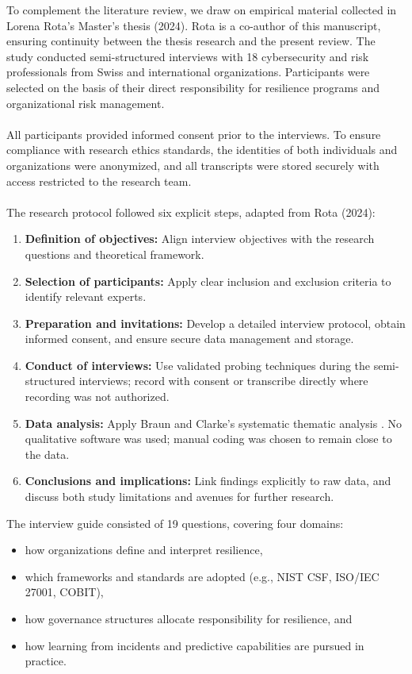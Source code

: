 To complement the literature review, we draw on empirical material collected in Lorena Rota’s Master’s thesis (2024). Rota is a co-author of this manuscript, ensuring continuity between the thesis research and the present review. The study conducted semi-structured interviews with 18 cybersecurity and risk professionals from Swiss and international organizations. Participants were selected on the basis of their direct responsibility for resilience programs and organizational risk management.\\
\\
All participants provided informed consent prior to the interviews. To ensure compliance with research ethics standards, the identities of both individuals and organizations were anonymized, and all transcripts were stored securely with access restricted to the research team.\\
\\
The research protocol followed six explicit steps, adapted from Rota (2024):
\begin{enumerate}
    \item \textbf{Definition of objectives:} Align interview objectives with the research questions and theoretical framework.
    \item \textbf{Selection of participants:} Apply clear inclusion and exclusion criteria to identify relevant experts.
    \item \textbf{Preparation and invitations:} Develop a detailed interview protocol, obtain informed consent, and ensure secure data management and storage.
    \item \textbf{Conduct of interviews:} Use validated probing techniques during the semi-structured interviews;
    record with consent or transcribe directly where recording was not authorized.  
    \item \textbf{Data analysis:} Apply Braun and Clarke’s systematic thematic analysis \autocite{braun2019thematic}.
    No qualitative software was used; manual coding was chosen to remain close to the data.  
    \item \textbf{Conclusions and implications:} Link findings explicitly to raw data, and discuss both study limitations and avenues for further research.\\
\end{enumerate}

The interview guide consisted of 19 questions, covering four domains:

\begin{itemize}
    \item[(a)] how organizations define and interpret resilience,
    \item[(b)] which frameworks and standards are adopted (e.g., NIST CSF, ISO/IEC 27001, COBIT),
    \item[(c)] how governance structures allocate responsibility for resilience, and
    \item[(d)] how learning from incidents and predictive capabilities are pursued in practice.\\
\end{itemize}

